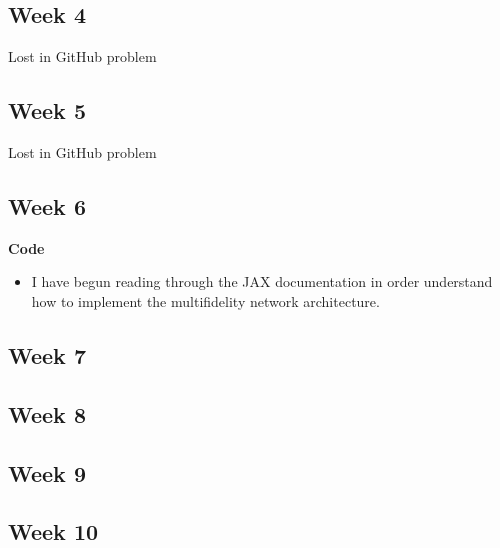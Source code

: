 \documentclass{article}
\begin{document}
\subsection*{Week 4}
Lost in GitHub problem
\newpage
\subsection*{Week 5} 
Lost in GitHub problem

\newpage
\subsection*{Week 6}
\textbf{Code}
\begin{itemize}
\item I have begun reading through the JAX documentation in order understand how to implement the multifidelity network architecture.
\end{itemize}
\newpage
\subsection*{Week 7}
\newpage 
\subsection*{Week 8} 
\newpage
\subsection*{Week 9}
\newpage
\subsection*{Week 10}  
\newpage
\end{document}
